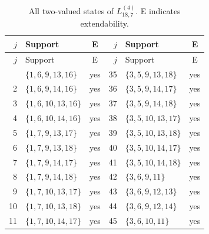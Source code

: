\documentclass[aps,pra,reprint,superscriptaddress,longbibliography,nofootinbib,floatfix,10pt]{revtex4-2}
\theoremstyle{definition}
\begin{document}
\begin{longtable}{rlc@{\qquad}rlc}
\caption{All two-valued states of $L_{18,7}^{(4)}$. E indicates extendability.}\label{tab:states-4d}\\\toprule $j$ & Support & E & $j$ & Support & E\\\midrule\endfirsthead
\toprule $j$ & Support & E & $j$ & Support & E\\\midrule\endhead\bottomrule\endfoot
1 & $\{1,\allowbreak 6,\allowbreak 9,\allowbreak 13,\allowbreak 16\}$ & yes & 35 & $\{3,\allowbreak 5,\allowbreak 9,\allowbreak 13,\allowbreak 18\}$ & yes\\
2 & $\{1,\allowbreak 6,\allowbreak 9,\allowbreak 14,\allowbreak 16\}$ & yes & 36 & $\{3,\allowbreak 5,\allowbreak 9,\allowbreak 14,\allowbreak 17\}$ & yes\\
3 & $\{1,\allowbreak 6,\allowbreak 10,\allowbreak 13,\allowbreak 16\}$ & yes & 37 & $\{3,\allowbreak 5,\allowbreak 9,\allowbreak 14,\allowbreak 18\}$ & yes\\
4 & $\{1,\allowbreak 6,\allowbreak 10,\allowbreak 14,\allowbreak 16\}$ & yes & 38 & $\{3,\allowbreak 5,\allowbreak 10,\allowbreak 13,\allowbreak 17\}$ & yes\\
5 & $\{1,\allowbreak 7,\allowbreak 9,\allowbreak 13,\allowbreak 17\}$ & yes & 39 & $\{3,\allowbreak 5,\allowbreak 10,\allowbreak 13,\allowbreak 18\}$ & yes\\
6 & $\{1,\allowbreak 7,\allowbreak 9,\allowbreak 13,\allowbreak 18\}$ & yes & 40 & $\{3,\allowbreak 5,\allowbreak 10,\allowbreak 14,\allowbreak 17\}$ & yes\\
7 & $\{1,\allowbreak 7,\allowbreak 9,\allowbreak 14,\allowbreak 17\}$ & yes & 41 & $\{3,\allowbreak 5,\allowbreak 10,\allowbreak 14,\allowbreak 18\}$ & yes\\
8 & $\{1,\allowbreak 7,\allowbreak 9,\allowbreak 14,\allowbreak 18\}$ & yes & 42 & $\{3,\allowbreak 6,\allowbreak 9,\allowbreak 11\}$ & yes\\
9 & $\{1,\allowbreak 7,\allowbreak 10,\allowbreak 13,\allowbreak 17\}$ & yes & 43 & $\{3,\allowbreak 6,\allowbreak 9,\allowbreak 12,\allowbreak 13\}$ & yes\\
10 & $\{1,\allowbreak 7,\allowbreak 10,\allowbreak 13,\allowbreak 18\}$ & yes & 44 & $\{3,\allowbreak 6,\allowbreak 9,\allowbreak 12,\allowbreak 14\}$ & yes\\
11 & $\{1,\allowbreak 7,\allowbreak 10,\allowbreak 14,\allowbreak 17\}$ & yes & 45 & $\{3,\allowbreak 6,\allowbreak 10,\allowbreak 11\}$ & yes\\

\end{longtable}
\end{document}
